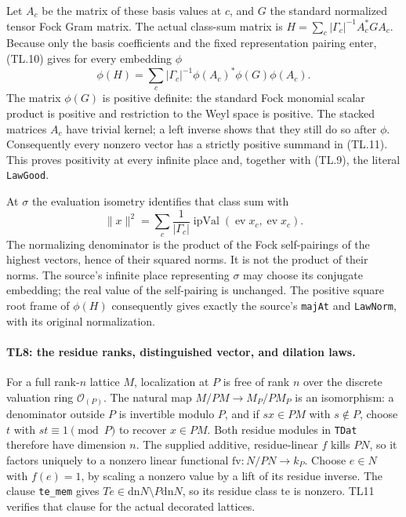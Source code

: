 \documentclass[11pt,a4paper]{article}
\numberwithin{equation}{section}
\theoremstyle{remark}\newtheorem{remark}[theorem]{Remark}
\begin{document}
Let $A_c$ be the matrix of these basis values at $c$, and $G$ the
standard normalized tensor Fock Gram matrix. The actual class-sum
matrix is $H=\sum_c |\Gamma_c|^{-1}A_c^*GA_c$. Because only the
basis coefficients and the fixed representation pairing enter,
(TL.10) gives for every embedding $\phi$
\[
 \phi(H)=\sum_c |\Gamma_c|^{-1}
               \phi(A_c)^*\phi(G)\phi(A_c).       \tag{TL.11}
\]
The matrix $\phi(G)$ is positive definite: the standard Fock
monomial scalar product is positive and restriction to the Weyl
space is positive. The stacked matrices $A_c$ have trivial kernel;
a left inverse shows that they still do so after $\phi$.
Consequently every nonzero vector has a strictly positive summand
in (TL.11). This proves positivity at every infinite place and,
together with (TL.9), the literal \texttt{LawGood}.

At $\sigma$ the evaluation isometry identifies that class sum with
\[
 \|x\|^2=\sum_c\frac{1}{|\Gamma_c|}
               \operatorname{ipVal}(\operatorname{ev}x_c,
                                     \operatorname{ev}x_c).
 \tag{TL.12}
\]
The normalizing denominator is the product of the Fock
self-pairings of the highest vectors, hence of their squared
norms. It is not the product of their norms. The source's infinite
place representing $\sigma$ may choose its conjugate embedding;
the real value of the self-pairing is unchanged. The positive square
root frame of $\phi(H)$ consequently gives exactly the source's
\texttt{majAt} and \texttt{LawNorm}, with its original normalization.

\paragraph{TL8: the residue ranks, distinguished vector, and dilation
laws.}
For a full rank-$n$ lattice $M$, localization at $P$ is free of rank
$n$ over the discrete valuation ring $\mathcal O_{(P)}$. The natural
map $M/PM\to M_P/PM_P$ is an isomorphism: a denominator outside
$P$ is invertible modulo $P$, and if $sx\in PM$ with $s\notin P$,
choose $t$ with $st\equiv1\pmod P$ to recover $x\in PM$.
Both residue modules in \texttt{TDat} therefore have dimension $n$.
The supplied additive, residue-linear $f$ kills $PN$, so it factors
uniquely to a nonzero linear functional $\mathrm{fv}:N/PN\to k_P$.
Choose $e\in N$ with $f(e)=1$, by scaling a nonzero value by a lift
of its residue inverse. The clause \texttt{te\_\allowbreak mem} gives
$Te\in\mathrm{dn}N\setminus P\mathrm{dn}N$, so its residue class
$\mathrm{te}$ is nonzero. TL11 verifies that clause for the actual
decorated lattices.
\end{document}
